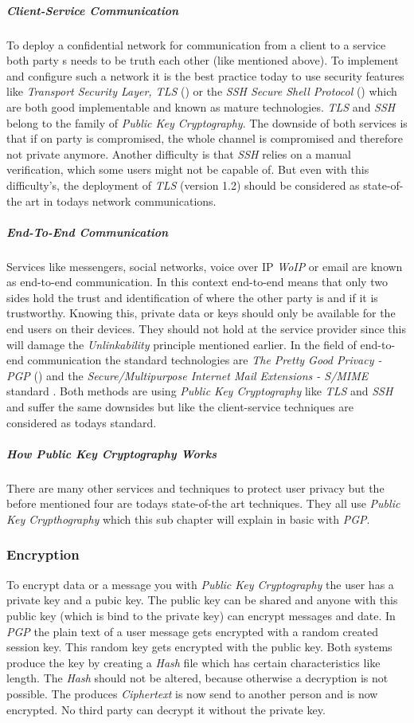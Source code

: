 \subparagraph{Client-Service Communication}
To deploy a confidential network for communication from a client to a service both party s needs to be truth each other (like mentioned above). To implement and configure such a network it is the best practice today to use security features like \textit{Transport Security Layer, TLS} (\cite{dierks2008transport}) or the \textit{SSH Secure Shell Protocol} (\cite{barrett2005ssh}) which are both good implementable and known as mature technologies. \textit{TLS} and \textit{SSH} belong to the family of \textit{Public Key Cryptography}. The downside of both services is that if on party is compromised, the whole channel is compromised and therefore not private anymore. Another difficulty is that \textit{SSH} relies on a manual verification, which some users might not be capable of. But even with this difficulty's, the deployment of \textit{TLS} (version 1.2) should be considered as state-of-the art in todays network communications.

\subparagraph{End-To-End Communication}
Services like messengers, social networks, voice over IP \textit{WoIP} or email are known as end-to-end communication. In this context end-to-end means that only two sides hold the trust and identification of where the other party is and if it is trustworthy. Knowing this, private data or keys should only be available for the end users on their devices. They should not hold at the service provider since this will damage the \textit{Unlinkability} principle mentioned earlier. In the field of end-to-end communication the standard technologies are \textit{The Pretty Good Privacy - PGP} (\cite{zimmermann1995official}) and the \textit{Secure/Multipurpose Internet Mail Extensions - S/MIME} standard \cite{ramsdell1999s}. Both methods are using \textit{Public Key Cryptography} like \textit{TLS} and \textit{SSH} and suffer the same downsides but like the client-service techniques are considered as todays standard.

\subparagraph{How Public Key Cryptography Works}
There are many other services and techniques to protect user privacy but the before mentioned four are todays state-of-the art techniques. They all use \textit{Public Key Crypthography} which this sub chapter will explain in basic with \textit{PGP}. 

\subsubsection{Encryption}
To encrypt data or a message you with \textit{Public Key Cryptography} the user has a private key and a pubic key. The public key can be shared and anyone with this public key (which is bind to the private key) can encrypt messages and date. In \textit{PGP} the plain text of a user message gets encrypted with a random created session key. This random key gets encrypted with the public key. Both systems produce the key by creating a \textit{Hash} file which has certain characteristics like length. The \textit{Hash} should not be altered, because otherwise a decryption is not possible. The produces \textit{Ciphertext} is now send to another person and is now encrypted. No third party can decrypt it without the private key.

